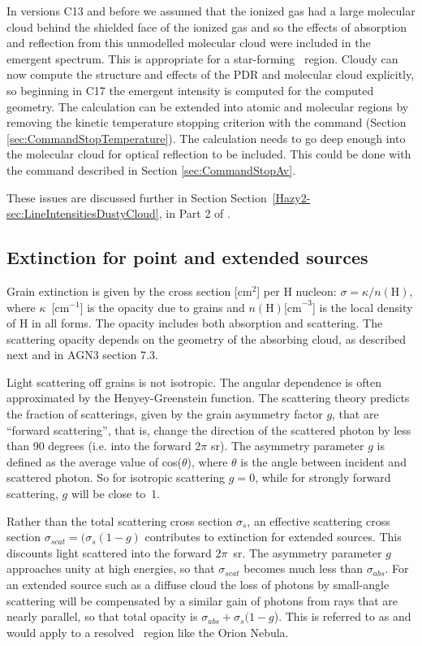 In versions C13 and before we assumed that the ionized
gas had a large molecular cloud behind the shielded face of the ionized
gas and so the effects of absorption and reflection from this unmodelled molecular cloud were included
in the emergent spectrum.  
This is appropriate for a star-forming \hii\ region.
Cloudy can now compute the structure and effects of the PDR and molecular cloud explicitly,
so beginning in C17 the emergent intensity is computed for the computed geometry.
The calculation can be extended into atomic and molecular regions by removing the
kinetic temperature stopping criterion with the  command
 (Section \ref{sec:CommandStopTemperature}).
The calculation needs to go deep enough into the molecular cloud for optical reflection
to be included.  This could be done with the command 
described in Section \ref{sec:CommandStopAv}.

These issues are discussed further in Section
Section~\ref{Hazy2-sec:LineIntensitiesDustyCloud},
in Part 2 of \Hazy.

\subsection{Extinction for point and extended sources}

Grain extinction is given by the cross section [cm$^2$] per H nucleon:
$\sigma  = \kappa /n( {\mathrm{H}} )$,
where $\kappa$~[cm$^{-1}$] is the opacity due
to grains and $n(\mathrm{H}) \mathrm{[cm}^{-3}$] is the
local density of H in all forms.
The opacity includes both absorption and
scattering.
The scattering opacity depends on the geometry of the absorbing
cloud, as described next and in AGN3 section 7.3.

Light scattering off grains is not isotropic.
The angular dependence
is often approximated by the Henyey-Greenstein function.
The scattering
theory predicts the fraction of scatterings,
given by the grain asymmetry
factor $g$, that are ``forward scattering'', that is,
change the direction
of the scattered photon by less than 90 degrees
(i.e. into the forward 2$\pi$ sr).
The asymmetry parameter $g$ is defined as the average value of
cos($\theta$), where $\theta$ is the angle between incident
and scattered photon.
So for isotropic scattering $g = 0$,
while for strongly forward scattering, $g$ will be close to~1.

Rather than the total scattering cross section $\sigma_s$,
an effective scattering
cross section $\sigma_{scat} = (\sigma_s (1-g)$
contributes to extinction for extended sources.
This discounts light scattered into the forward $2\pi$~sr.
The asymmetry parameter $g$ approaches unity at high energies,
so that $\sigma_{scat}$
becomes much less than $\sigma_{abs}$.
For an extended source such as a diffuse cloud
the loss of photons by small-angle scattering will be compensated
by a
similar gain of photons from rays that are nearly parallel,
so that total
opacity is $\sigma_{abs} + \sigma_s(1-g$).
This is referred to as 
and would apply to a resolved \hii\ region like the Orion Nebula.

